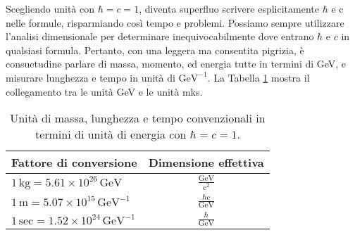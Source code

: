 Scegliendo unità con $\hbar = c = 1$, diventa superfluo scrivere esplicitamente $\hbar$ e $\mathrm{c}$ nelle formule, risparmiando così tempo e problemi. Possiamo sempre utilizzare l'analisi dimensionale per determinare inequivocabilmente dove entrano $\hbar$ e $c$ in qualsiasi formula. Pertanto, con una leggera ma consentita pigrizia, è consuetudine parlare di massa, momento, ed energia tutte in termini di GeV, e misurare lunghezza e tempo in unità di $\mathrm{GeV}^{-1}$. La Tabella \ref{tab: natural units} mostra il collegamento tra le unità GeV e le unità mks.
    \begin{table}[ht]
        \centering
        \begin{tabular}{lc}
            \toprule 
            Fattore di conversione & Dimensione effettiva \\ 
            \midrule \vspace{0.2cm}
            $1 \, \mathrm{kg} = 5.61 \times 10^{26} \, \mathrm{GeV}$ & $\displaystyle \frac{\mathrm{GeV}}{\mathrm{c}^2}$ \\ \vspace{0.2cm}
            $1 \, \mathrm{m} = 5.07 \times 10^{15} \, \mathrm{GeV}^{-1}$ & $\displaystyle \frac{\hbar \mathrm{c}}{\mathrm{GeV}}$ \\
            $1 \, \mathrm{sec} = 1.52 \times 10^{24} \, \mathrm{GeV}^{-1}$ & $\displaystyle \frac{\hbar}{\mathrm{GeV}}$ \\
            \bottomrule
        \end{tabular}
        \caption{Unità di massa, lunghezza e tempo convenzionali in termini di unità di energia con $\hbar = c = 1$.}
        \label{tab: natural units}
    \end{table}